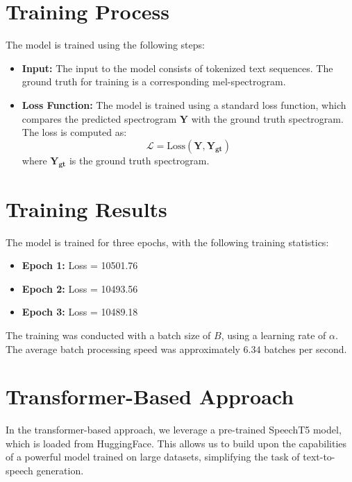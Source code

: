 \documentclass[12pt]{article}
\begin{document}
\section{Training Process}

The model is trained using the following steps:

\begin{itemize}
    \item \textbf{Input:} The input to the model consists of tokenized text sequences. The ground truth for training is a corresponding mel-spectrogram.
    \item \textbf{Loss Function:} The model is trained using a standard loss function, which compares the predicted spectrogram $\mathbf{Y}$ with the ground truth spectrogram. The loss is computed as:
    \[
    \mathcal{L} = \text{Loss}(\mathbf{Y}, \mathbf{Y_{\text{gt}}})
    \]
    where $\mathbf{Y_{\text{gt}}}$ is the ground truth spectrogram.

\end{itemize}

\section{Training Results}

The model is trained for three epochs, with the following training statistics:

\begin{itemize}
    \item \textbf{Epoch 1:} Loss = 10501.76
    \item \textbf{Epoch 2:} Loss = 10493.56
    \item \textbf{Epoch 3:} Loss = 10489.18
\end{itemize}

The training was conducted with a batch size of $B$, using a learning rate of $\alpha$. The average batch processing speed was approximately $6.34$ batches per second.



\section*{Transformer-Based Approach}

In the transformer-based approach, we leverage a pre-trained SpeechT5 model, which is loaded from HuggingFace. This allows us to build upon the capabilities of a powerful model trained on large datasets, simplifying the task of text-to-speech generation.
\end{document}
